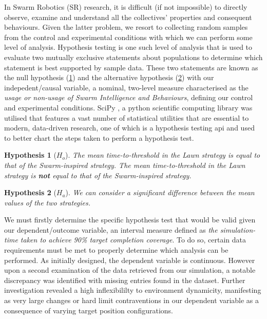 \documentclass{report}
\newtheorem*{hyp}{Hypothesis}
\begin{document}
In Swarm Robotics (SR) research, it is difficult (if not impossible) to directly observe, examine and understand all the collectives' properties and consequent behaviours. Given the latter problem, we resort to collecting random samples from the control and experimental conditions with which we can perform some level of analysis. Hypothesis testing is one such level of analysis that is used to evaluate two mutually exclusive statements about populations to determine which statement is best supported by sample data. These two statements are known as the null hypothesis (\ref{hyp:null2}) and the alternative hypothesis (\ref{hyp:alt2}) with our indepedent/causal variable, a nominal, two-level measure characterised as the \textit{usage or non-usage of Swarm Intelligence and Behaviours}, defining our control and experimental conditions. SciPy \cite{SCIPY}, a python scientific computing library was utilised that features a vast number of statistical utilities that are essential to modern, data-driven research, one of which is a hypothesis testing api and \cite{bmgi} used to better chart the steps taken to perform a hypothesis test.

\begin{hyp}[$H_o$]\label{hyp:null2}
	The mean time-to-threshold in the Lawn strategy is equal to that of the Swarm-inspired strategy.
	The mean time-to-threshold in the Lawn strategy is \textbf{not} equal to that of the Swarm-inspired strategy.
\end{hyp}
	
\begin{hyp}[$H_a$]\label{hyp:alt2}
	We can consider a significant difference between the mean values of the two strategies.
\end{hyp}

 We must firstly determine the specific hypothesis test that would be valid given our dependent/outcome variable, an interval measure defined as \textit{the simulation-time taken to achieve 90\% target completion coverage}. To do so, certain data requirements must be met to properly determine which analysis can be performed. As initially designed, the dependent variable is continuous. However upon a second examination of the data retrieved from our simulation, a notable discrepancy was identified with missing entries found in the dataset. Further investigation revealed a high inflexibililty to environment dynamicity, manifesting as very large changes or hard limit contraventions in our dependent variable as a consequence of varying target position configurations.
\end{document}
